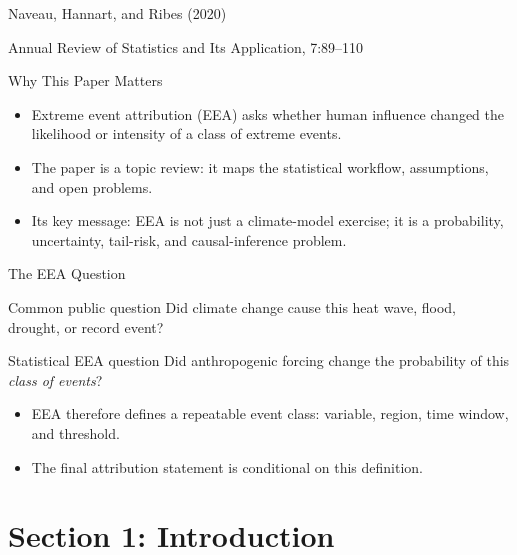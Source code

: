 \documentclass[aspectratio=169]{beamer}
\begin{document}
\begin{frame}[plain]
  \sectionpage
  \vspace{-1.2cm}
  \begin{center}
    {\large Naveau, Hannart, and Ribes (2020)\par}
    \vspace{0.25cm}
    {\small Annual Review of Statistics and Its Application, 7:89--110\par}
  \end{center}
\end{frame}

\begin{frame}{Why This Paper Matters}
  \begin{itemize}
    \item Extreme event attribution (EEA) asks whether human influence changed the likelihood or intensity of a class of extreme events.
    \item The paper is a topic review: it maps the statistical workflow, assumptions, and open problems.
    \item Its key message: EEA is not just a climate-model exercise; it is a probability, uncertainty, tail-risk, and causal-inference problem.
  \end{itemize}
\end{frame}

\begin{frame}{The EEA Question}
  \begin{block}{Common public question}
    Did climate change cause this heat wave, flood, drought, or record event?
  \end{block}

  \begin{block}{Statistical EEA question}
    Did anthropogenic forcing change the probability of this \emph{class of events}?
  \end{block}

  \vspace{0.2cm}
  \begin{itemize}
    \item EEA therefore defines a repeatable event class: variable, region, time window, and threshold.
    \item The final attribution statement is conditional on this definition.
  \end{itemize}
\end{frame}

\section{Section 1: Introduction}
\end{document}
